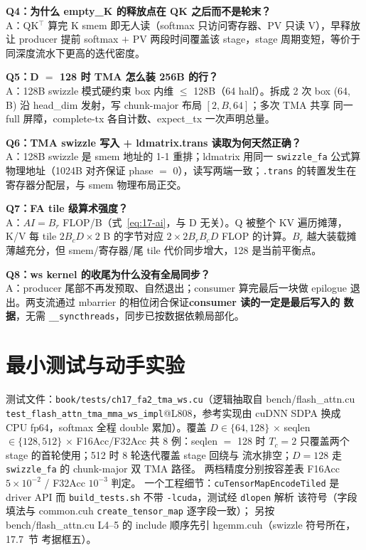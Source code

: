\textbf{Q4：为什么 empty\_K 的释放点在 QK 之后而不是轮末？}\\
A：QK$^\top$ 算完 K smem 即无人读（softmax 只访问寄存器、PV 只读 V），早释放
让 producer 提前 softmax $+$ PV 两段时间覆盖该 stage，stage 周期变短，等价于
同深度流水下更高的迭代密度。

\textbf{Q5：D $=$ 128 时 TMA 怎么装 256B 的行？}\\
A：128B swizzle 模式硬约束 box 内维 $\le$ 128B（64 half）。拆成 2 次 box
(64, B) 沿 head\_dim 发射，写 chunk-major 布局 $[2, B, 64]$；多次 TMA 共享
同一 full 屏障，complete-tx 各自计数、expect\_tx 一次声明总量。

\textbf{Q6：TMA swizzle 写入 + ldmatrix.trans 读取为何天然正确？}\\
A：128B swizzle 是 smem 地址的 1-1 重排；ldmatrix 用同一 \texttt{swizzle\_fa}
公式算物理地址（1024B 对齐保证 phase $=$ 0），读写两端一致；\texttt{.trans}
的转置发生在寄存器分配层，与 smem 物理布局正交。

\textbf{Q7：FA tile 级算术强度？}\\
A：$AI = B_r$ FLOP/B（式~\ref{eq:17-ai}，与 D 无关）。Q 被整个 KV 遍历摊薄，
K/V 每 tile $2 B_c D \times 2$ B 的字节对应 $2 \times 2 B_r B_c D$ FLOP 的计算。$B_r$
越大装载摊薄越充分，但 smem/寄存器/尾 tile 代价同步增大，128 是当前平衡点。

\textbf{Q8：ws kernel 的收尾为什么没有全局同步？}\\
A：producer 尾部不再发预取、自然退出；consumer 算完最后一块做 epilogue
退出。两支流通过 mbarrier 的相位闭合保证\textbf{consumer 读的一定是最后写入的
数据}，无需 \texttt{\_\allowbreak{}\_\allowbreak{}syncthreads}，同步已按数据依赖局部化。

\section{最小测试与动手实验}

测试文件：\texttt{book/\allowbreak{}tests/\allowbreak{}ch17\_\allowbreak{}fa2\_\allowbreak{}tma\_\allowbreak{}ws.cu}（逻辑抽取自 bench/flash\_attn.cu
\texttt{test\_\allowbreak{}flash\_\allowbreak{}attn\_\allowbreak{}tma\_\allowbreak{}mma\_\allowbreak{}ws\_\allowbreak{}impl}@L808，参考实现由 cuDNN SDPA
换成 CPU fp64，softmax 全程 double 累加）。覆盖 $D \in \{64, 128\}$ $\times$
seqlen $\in \{128, 512\}$ $\times$ F16Acc/F32Acc 共 8 例：seqlen $=$ 128 时
$T_c{=}2$ 只覆盖两个 stage 的首轮使用；512 时 8 轮迭代覆盖 stage 回绕与
流水排空；$D{=}128$ 走 \texttt{swizzle\_fa} 的 chunk-major 双 TMA 路径。
两档精度分别按容差表 F16Acc $5 \times 10^{-2}$ / F32Acc $10^{-3}$ 判定。
一个工程细节：\texttt{cu\allowbreak{}Tensor\allowbreak{}Map\allowbreak{}Encode\allowbreak{}Tiled} 是 driver API 而
\texttt{build\_\allowbreak{}tests.\allowbreak{}sh} 不带 \texttt{-lcuda}，测试经 \texttt{dlopen} 解析
该符号（字段填法与 common.cuh \texttt{create\_\allowbreak{}tensor\_\allowbreak{}map} 逐字段一致）；
另按 bench/flash\_attn.cu L4--5 的 include 顺序先引 hgemm.cuh（swizzle 符号所在，17.7~节
考据框五）。

